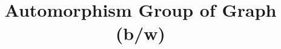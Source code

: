 \documentclass[12pt]{article}
\newcommand\setTBstruts{\def\T{\rule{0pt}{2.6ex}}%
\def\B{\rule[-1.2ex]{0pt}{0pt}}}
\begin{document}
 
\setTBstruts



{\allowdisplaybreaks%






\title{Automorphism Group of Graph (b/w)}
\author{}%
\maketitle%
%



}
\end{document}
